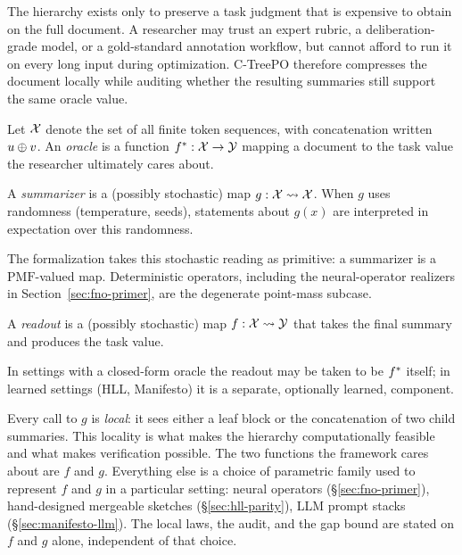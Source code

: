 The hierarchy exists only to preserve a task judgment that is expensive to obtain on the full document. A researcher may trust an expert rubric, a deliberation-grade model, or a gold-standard annotation workflow, but cannot afford to run it on every long input during optimization. C-TreePO therefore compresses the document locally while auditing whether the resulting summaries still support the same oracle value.

\begin{definition}[Oracle]\label{def:oracle}
Let $\mathcal{X}$ denote the set of all finite token sequences, with concatenation written $u \oplus v$. An \emph{oracle} is a function $f^\ast: \mathcal{X} \to \mathcal{Y}$ mapping a document to the task value the researcher ultimately cares about.
\end{definition}

\begin{definition}[Summarizer]\label{def:summarizer}
A \emph{summarizer} is a (possibly stochastic) map $g: \mathcal{X} \rightsquigarrow \mathcal{X}$. When $g$ uses randomness (temperature, seeds), statements about $g(x)$ are interpreted in expectation over this randomness.
\end{definition}

The formalization takes this stochastic reading as primitive: a summarizer is a $\mathrm{PMF}$-valued map. Deterministic operators, including the neural-operator realizers in Section~\ref{sec:fno-primer}, are the degenerate point-mass subcase.

\begin{definition}[Readout]\label{def:readout}
A \emph{readout} is a (possibly stochastic) map $f : \mathcal{X} \rightsquigarrow \mathcal{Y}$ that takes the final summary and produces the task value.
\end{definition}

In settings with a closed-form oracle the readout may be taken to be $f^\ast$ itself; in learned settings (HLL, Manifesto) it is a separate, optionally learned, component.

Every call to $g$ is \emph{local}: it sees either a leaf block or the concatenation of two child summaries. This locality is what makes the hierarchy computationally feasible and what makes verification possible. The two functions the framework cares about are $f$ and $g$. Everything else is a choice of parametric family used to represent $f$ and $g$ in a particular setting: neural operators (\S\ref{sec:fno-primer}), hand-designed mergeable sketches (\S\ref{sec:hll-parity}), LLM prompt stacks (\S\ref{sec:manifesto-llm}). The local laws, the audit, and the gap bound are stated on $f$ and $g$ alone, independent of that choice.

